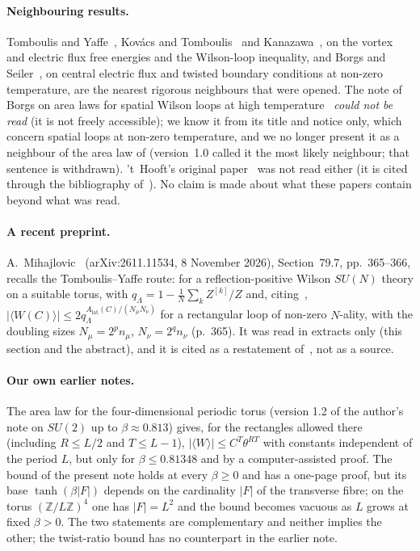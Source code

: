 \documentclass[11pt,a4paper]{article}
\theoremstyle{plain}
\theoremstyle{definition}
\theoremstyle{remark}
\numberwithin{equation}{section}
\newcommand{\Z}{\mathbb{Z}}
\newcommand{\lean}[1]{\texttt{\expandafter\leanbk\detokenize{#1}\relax}}
\def\leanbk#1{\ifx#1\relax\else\ifx#1.#1\allowbreak\else\ifx#1_#1\allowbreak\else#1\fi\fi\expandafter\leanbk\fi}
\begin{document}
\paragraph{Neighbouring results.} Tomboulis and Yaffe~\cite{TY85}, Kov\'acs and Tomboulis~\cite{KT02} and Kanazawa~\cite{Kan}, on the vortex and electric flux free energies and the Wilson-loop inequality, and Borgs and Seiler~\cite{BS83}, on central electric flux and twisted boundary conditions at non-zero temperature, are the nearest rigorous neighbours that were opened. The note of Borgs on area laws for spatial Wilson loops at high temperature~\cite{Bor85} \emph{could not be read} (it is not freely accessible); we know it from its title and notice only, which concern spatial loops at non-zero temperature, and we no longer present it as a neighbour of the area law of \lean{tube_area_law_rectangle} (version~1.0 called it the most likely neighbour; that sentence is withdrawn). 't~Hooft's original paper~\cite{tH79} was not read either (it is cited through the bibliography of~\cite{TY85}). No claim is made about what these papers contain beyond what was read.

\paragraph{A recent preprint.} A.~Mihajlovic~\cite{Mih} (arXiv:2611.11534, 8 November 2026), Section~79.7, pp.~365--366, recalls the Tomboulis--Yaffe route: for a reflection-positive Wilson $SU(N)$ theory on a suitable torus, with $q_\Lambda=1-\frac1N\sum_kZ^{[k]}/Z$ and, citing~\cite{Kan}, $|\langle W(C)\rangle|\le2q_\Lambda^{A_{\mathrm{lat}}(C)/(N_\mu N_\nu)}$ for a rectangular loop of non-zero $N$-ality, with the doubling sizes $N_\mu=2^pn_\mu$, $N_\nu=2^qn_\nu$ (p.~365). It was read in extracts only (this section and the abstract), and it is cited as a restatement of~\cite{Kan}, not as a source.

\paragraph{Our own earlier notes.} The area law for the four-dimensional periodic torus (version 1.2 of the author's note on $SU(2)$ up to $\beta\approx0.813$) gives, for the rectangles allowed there (including $R\le L/2$ and $T\le L-1$), $|\langle W\rangle|\le C^T\theta^{RT}$ with constants independent of the period $L$, but only for $\beta\le0.81348$ and by a computer-assisted proof. The bound of the present note holds at every $\beta\ge0$ and has a one-page proof, but its base $\tanh(\beta|F|)$ depends on the cardinality $|F|$ of the transverse fibre; on the torus $(\Z/L\Z)^4$ one has $|F|=L^2$ and the bound becomes vacuous as $L$ grows at fixed $\beta>0$. The two statements are complementary and neither implies the other; the twist-ratio bound has no counterpart in the earlier note.
\end{document}
